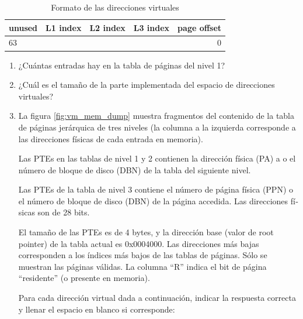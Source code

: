   \begin{table}[h]
  \begin{center}
  \begin{tabular}{|c|c|c|c|c|}
  \hline
  unused & L1 index & L2 index & L3 index & page offset \\
  \hline
  \multicolumn{3}{l}{63} & \multicolumn{2}{r}{0} \\
  \end{tabular}
  \caption{Formato de las direcciones virtuales}
  \label{tbl:vm_addr_fmt}
  \end{center}
  \end{table}

  \begin{enumerate}
  \item ¿Cuántas entradas hay en la tabla de páginas del nivel 1?
  \item ¿Cuál es el tamaño de la parte implementada del espacio de direcciones virtuales?
  \item La figura \ref{fig:vm_mem_dump} muestra fragmentos del contenido de la
	tabla de páginas jerárquica de tres niveles (la columna a la izquierda
	corresponde a las direcciones fí­sicas de cada entrada en memoria).

	Las PTEs en las tablas de nivel 1 y 2 contienen la dirección fí­sica
	(PA) a o el número de bloque de disco (DBN) de la tabla del
	siguiente nivel.

	Las PTEs de la tabla de nivel 3 contiene el número de página fí­sica
	(PPN) o el número de bloque de disco (DBN) de la página accedida.
	Las direcciones fí­sicas son de 28 bits.
	
	El tamaño de las PTEs es de 4 bytes, y la dirección base (valor de 
	root pointer) de la tabla actual es 0x0004000. Las direcciones más
	bajas corresponden a los í­ndices más bajos de las tablas de páginas.
	Sólo se muestran las páginas válidas. La columna ``R'' indica el bit
	de página ``residente'' (o presente en memoria).
  
	Para cada dirección virtual dada a continuación, indicar la
	respuesta correcta y llenar el espacio en blanco si corresponde:
  

\end{enumerate}
